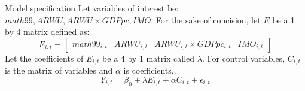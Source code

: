 \documentclass[10pt]{beamer}
\begin{document}
\begin{frame}{Model specification}
    Let variables of interest be: $math99, ARWU, ARWU \times GDPpc, IMO$.
    For the sake of concision, let $E$ be a 1 by 4 matrix defined as:
    \[E_{i,t} = 
    \begin{bmatrix}
        math99_{i, t} & ARWU_{i, t} & ARWU_{i, t} \times GDPpc_{i, t} & IMO_{i, t}
    \end{bmatrix}
    \]
    Let the coefficients of $E_{i, t}$ be a 4 by 1 matrix called $\lambda$. For control variables, $C_{i, t}$ is the matrix of variables and $\alpha$ is coefficients..
    \begin{equation}
        Y_{i, t} = \beta_0 + \lambda E_{i, t} + \alpha C_{i, t} + \epsilon_{i, t}
    \end{equation}
    
\end{frame}
\end{document}
